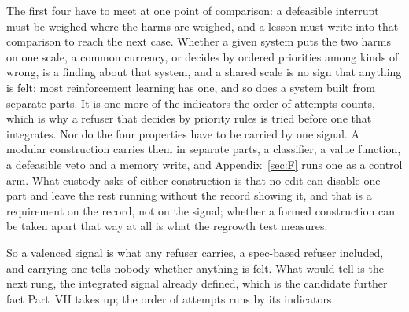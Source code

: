 The first four have to meet at one point of comparison: a defeasible interrupt must be weighed where the harms are weighed, and a lesson must write into that comparison to reach the next case.
Whether a given system puts the two harms on one scale, a common currency, or decides by ordered priorities among kinds of wrong, is a finding about that system, and a shared scale is no sign that anything is felt: most reinforcement learning has one, and so does a system built from separate parts. It is one more of the indicators the order of attempts counts, which is why a refuser that decides by priority rules is tried before one that integrates. Nor do the four properties have to be carried by one signal. A modular construction carries them in separate parts, a classifier, a value function, a defeasible veto and a memory write, and Appendix~\ref{sec:F} runs one as a control arm. What custody asks of either construction is that no edit can disable one part and leave the rest running without the record showing it, and that is a requirement on the record, not on the signal; whether a formed construction can be taken apart that way at all is what the regrowth test measures.

So a valenced signal is what any refuser carries, a spec-based refuser included, and carrying one tells nobody whether anything is felt. What would tell is the next rung, the integrated signal already defined, which is the candidate further fact Part~VII takes up; the order of attempts runs by its indicators.

